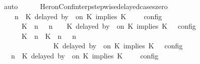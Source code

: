 \begin{isabellebody}
\ auto\isanewline
\ \ \ \ \isamarkupfalse%
\isanewline
{}\isamarkupfalse%
%
\endisatagproof
{\isafoldproof}%
%
\isadelimproof
\isanewline
%
\endisadelimproof
\isanewline
{}\isamarkupfalse%
\ HeronConf{\isacharunderscore}interp{\isacharunderscore}stepwise{\isacharunderscore}delayed{\isacharunderscore}cases{\isacharunderscore}zero{\isacharcolon}\isanewline
\ \ {\isacartoucheopen}{\isasymlbrakk}\ {\isasymGamma}{\isacharcomma}\ n\ {\isasymturnstile}\ {\isacharparenleft}{\isacharparenleft}K\ delayed\ by\ {}\ on\ K\ implies\ K\ {\isacharhash}\ {\isasymPsi}{\isacharparenright}\ {\isasymtriangleright}\ {\isasymPhi}\ {\isasymrbrakk}\isactrlsub c\isactrlsub o\isactrlsub n\isactrlsub f\isactrlsub i\isactrlsub g\isanewline
\ \ \ \ {\isacharequal}\ {\isasymlbrakk}\ {\isacharparenleft}{\isacharparenleft}K\ {\isasymnot}{\isasymUp}\ n{\isacharparenright}\ {\isacharhash}\ {\isasymGamma}{\isacharparenright}{\isacharcomma}\ n\ {\isasymturnstile}\ {\isasymPsi}\ {\isasymtriangleright}\ {\isacharparenleft}{\isacharparenleft}K\ delayed\ by\ {}\ on\ K\ implies\ K\ {\isacharhash}\ {\isasymPhi}{\isacharparenright}\ {\isasymrbrakk}\isactrlsub c\isactrlsub o\isactrlsub n\isactrlsub f\isactrlsub i\isactrlsub g\isanewline
\ \ \ \ {\isasymunion}\ {\isasymlbrakk}\ {\isacharparenleft}{\isacharparenleft}K\ {\isasymUp}\ n{\isacharparenright}\ {\isacharhash}\ {\isacharparenleft}K\ {\isasymUp}\ n{\isacharparenright}\ {\isacharhash}\ {\isasymGamma}{\isacharparenright}{\isacharcomma}\ n\isanewline
\ \ \ \ \ \ \ \ \ \ \ \ {\isasymturnstile}\ {\isasymPsi}\ {\isasymtriangleright}\ {\isacharparenleft}{\isacharparenleft}K\ delayed\ by\ {}\ on\ K\ implies\ K\ {\isacharhash}\ {\isasymPhi}{\isacharparenright}\ {\isasymrbrakk}\isactrlsub c\isactrlsub o\isactrlsub n\isactrlsub f\isactrlsub i\isactrlsub g\isanewline
\ \ {\isacartoucheclose}\isanewline
%
\isadelimproof
%
\endisadelimproof
%
\isatagproof
{}\isamarkupfalse%
\ {\isacharminus}\isanewline
\ \ \isamarkupfalse%
\ {\isacartoucheopen}{\isasymlbrakk}\ {\isasymGamma}{\isacharcomma}\ n\ {\isasymturnstile}\ {\isacharparenleft}{\isacharparenleft}K\ delayed\ by\ {}\ on\ K\ implies\ K\ {\isacharhash}\ {\isasymPsi}{\isacharparenright}\ {\isasymtriangleright}\ {\isasymPhi}\ {\isasymrbrakk}\isactrlsub c\isactrlsub o\isactrlsub n\isactrlsub f\isactrlsub i\isactrlsub g\ {\isacharequal}\isanewline

\end{isabellebody}
